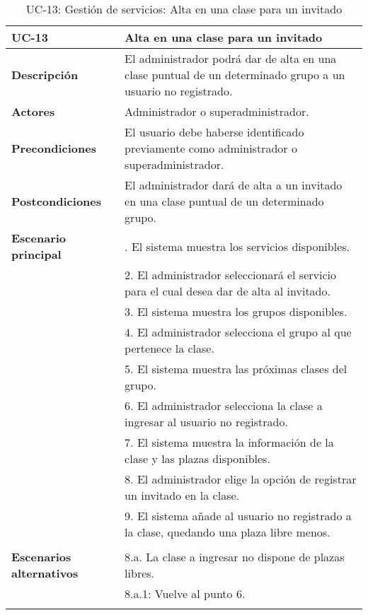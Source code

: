 \begin{table}[H]
  \begin{center}
    \begin{tabularx}{16.4cm}{|l|X|}
      \hline
      \textbf{UC-13} & \textbf{Alta en una clase para un invitado}\\
      \hline
      \textbf{Descripción} & El administrador podrá dar de alta en una clase puntual de un determinado grupo a un usuario no registrado.\\
      \hline
      \textbf{Actores} & Administrador o superadministrador.\\
      \hline
      \textbf{Precondiciones} & El usuario debe haberse identificado previamente como administrador o superadministrador.\\
      \hline
      \textbf{Postcondiciones} & El administrador dará de alta a un invitado en una clase puntual de un determinado grupo.\\
      \hline
      \textbf{Escenario principal} & \smallskip 1. El sistema muestra los servicios disponibles.\\
      & 2. El administrador seleccionará el servicio para el cual desea dar de alta al invitado.\\
      & 3. El sistema muestra los grupos disponibles.\\
      & 4. El administrador selecciona el grupo al que pertenece la clase. \\
      & 5. El sistema muestra las próximas clases del grupo.\\
      & 6. El administrador selecciona la clase a ingresar al usuario no registrado.\\
      & 7. El sistema muestra la información de la clase y las plazas disponibles.\\
      & 8. El administrador elige la opción de registrar un invitado en la clase.\\
      & 9. El sistema añade al usuario no registrado a la clase, quedando una plaza libre menos.\\
      & \\
      \hline
      \textbf{Escenarios alternativos} & \smallskip 8.a. La clase a ingresar no dispone de plazas libres.\\
      & \hspace{0.3cm} 8.a.1: Vuelve al punto 6. \\
      & \\
      \hline
    \end{tabularx}
    \caption{UC-13: Gestión de servicios: Alta en una clase para un invitado}
  \end{center}
\end{table}


